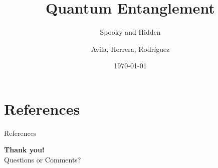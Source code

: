 \documentclass[aspectratio=169,sn-mathphys-num]{beamer}
\title{Quantum Entanglement}
\subtitle{Spooky and Hidden}
\author{Avila, Herrera, Rodríguez}
\institute{Universidad Distrital Francisco José de Caldas}
\date{\today}
\begin{document}
\begin{frame}
	\titlepage
\end{frame}











\section{References}
\begin{frame}[allowframebreaks]{References}
	\printbibliography
	\nocite{*}
\end{frame}

\begin{frame}[plain]
	\centering
	\vspace{1cm}
	{\Huge \textbf{Thank you!}}\\[1cm]
	{\large Questions or Comments?}
\end{frame}

\begin{frame}
	\titlepage
\end{frame}
\end{document}
